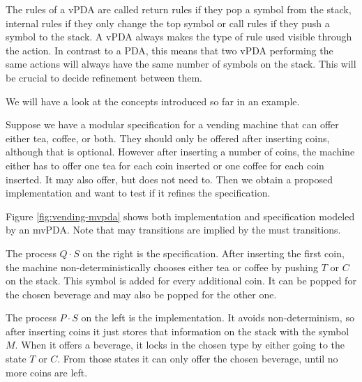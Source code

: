 The rules of a vPDA are called return rules if they pop a symbol
from the stack, internal rules if they only change the top symbol
or call rules if they push a symbol to the stack.
A vPDA always makes the type of rule used visible through the
action. In contrast to a PDA, this means that two vPDA
performing the same actions will always have the same number
of symbols on the stack. This will be crucial to decide
refinement between them.

We will have a look at the concepts introduced so far in an example.

\begin{example}
  Suppose we have a modular specification for a vending machine
  that can offer either tea, coffee, or both.
  They should only be offered after inserting coins, although that is optional.
  However after inserting a number of coins, the machine either has to offer
  one tea for each coin inserted or one coffee for each coin inserted.
  It may also offer, but does not need to.
  Then we obtain a proposed implementation and want to test if it refines
  the specification.
  
  Figure \ref{fig:vending-mvpda} shows both implementation and specification modeled by
  an mvPDA. Note that may transitions are implied by the must transitions.

  The process $Q⋅S$ on the right is the specification. 
  After inserting the first coin, the machine
  non-deterministically chooses either tea or coffee by pushing $T$ or $C$
  on the stack. This symbol is added for every additional coin.
  It can be popped for the chosen beverage and may also be popped for the
  other one.
  
  The process $P⋅S$ on the left is the implementation.
  It avoids non-determinism, so after inserting
  coins it just stores that information on the stack with the symbol $M$.
  When it offers a beverage, it locks in the chosen type by either going to
  the state $T$ or $C$. From those states it can only offer the chosen beverage,
  until no more coins are left.
\end{example}

